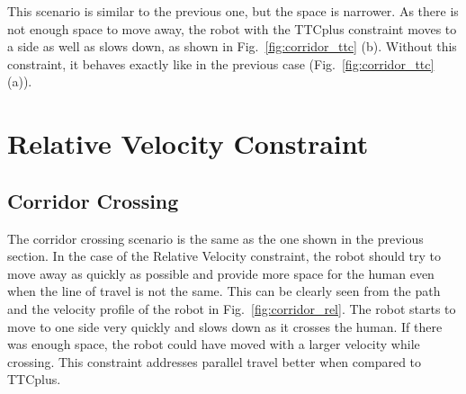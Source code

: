 \hspace{\parindent} This scenario is similar to the previous one, but the space is narrower. As there is not enough space to move away, the robot with the TTCplus constraint moves to a side as well as slows down, as shown in Fig.~\ref{fig:corridor_ttc} (b). Without this constraint, it behaves exactly like in the previous case (Fig.~\ref{fig:corridor_ttc} (a)). 

\section{Relative Velocity Constraint}
\subsection{Corridor Crossing}
\hspace{\parindent} The corridor crossing scenario is the same as the one shown in the previous section. In the case of the Relative Velocity constraint, the robot should try to move away as quickly as possible and provide more space for the human even when the line of travel is not the same. This can be clearly seen from the path and the velocity profile of the robot in Fig.~\ref{fig:corridor_rel}. The robot starts to move to one side very quickly and slows down as it crosses the human. If there was enough space, the robot could have moved with a larger velocity while crossing. This constraint addresses parallel travel better when compared to TTCplus.

